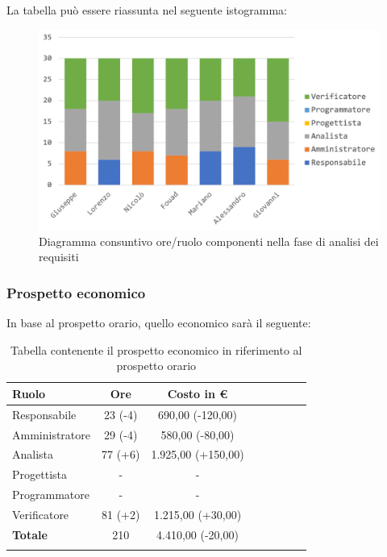 			La tabella può essere riassunta nel seguente istogramma:
			
			\begin{figure}[H]
				\centering
				\includegraphics[width=0.8\linewidth]{images/consuntivo/analisiCons1.png}
				\caption{Diagramma consuntivo ore/ruolo componenti nella fase di analisi dei requisiti}
				\label{fig:consuntivo diagramma suddivisione ruoli fase analisi dei requisiti}
			\end{figure}
			
		\subsubsection{Prospetto economico}
			In base al prospetto orario, quello economico sarà il seguente: 
			
			\begin{longtable}{|l|c|c|c|c|c|c|c}
				\hline
				\rowcolor{lighter-grayer}
				\textbf{Ruolo} & \textbf{Ore} & \textbf{Costo in €} \\
				\hline
				\endfirsthead
				
				\hline
				Responsabile & 23 (-4) & 690,00 (-120,00)\\
				\hline
				\hline
				Amministratore & 29 (-4) & 580,00 (-80,00)\\
				\hline
				\hline
				Analista & 77 (+6) & 1.925,00 (+150,00)\\
				\hline
				\hline
				Progettista & - & -\\
				\hline
				\hline
				Programmatore & - & -\\
				\hline
				\hline
				Verificatore & 81 (+2) & 1.215,00 (+30,00)\\
				\hline
				\textbf{Totale} & 210 & 4.410,00 (-20,00)\\
				\hline
				\caption{Tabella contenente il prospetto economico in riferimento al prospetto orario}
			\end{longtable}
			\pagebreak
			
